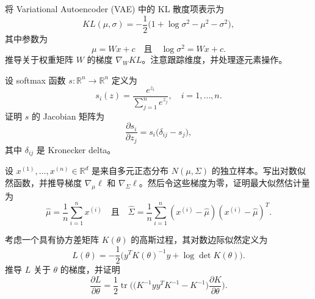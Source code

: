 \begin{exercise}
   将 Variational Autoencoder (VAE) 中的 KL 散度项表示为
   \[
      KL(\mu,\sigma) = -\frac{1}{2}\Big(1 + \log\sigma^2 - \mu^2 - \sigma^2\Big),
   \]
   其中参数为
   \[
      \mu = W x + c \quad \text{且} \quad \log\sigma^2 = W x + c.
   \]
   推导关于权重矩阵 $W$ 的梯度 $\nabla_W KL$。注意跟踪维度，并处理逐元素操作。
\end{exercise}
\begin{exercise}
   设 softmax 函数 $s:\mathbb{R}^n \to \mathbb{R}^n$ 定义为
   \[
      s_i(z) = \frac{e^{z_i}}{\sum_{j=1}^n e^{z_j}}, \quad i=1,\dots,n.
   \]
   证明 $s$ 的 Jacobian 矩阵为
   \[
      \frac{\partial s_i}{\partial z_j} = s_i\big(\delta_{ij} - s_j\big),
   \]
   其中 $\delta_{ij}$ 是 Kronecker delta。
\end{exercise}

\begin{exercise}
   设 $x^{(1)},\dots,x^{(n)} \in \mathbb{R}^d$ 是来自多元正态分布 $N(\mu,\Sigma)$ 的独立样本。写出对数似然函数，并推导梯度 $\nabla_\mu \ell$ 和 $\nabla_\Sigma \ell$。然后令这些梯度为零，证明最大似然估计量为
   \[
      \hat\mu = \frac{1}{n}\sum_{i=1}^n x^{(i)} \quad \text{且} \quad \hat\Sigma = \frac{1}{n}\sum_{i=1}^n (x^{(i)} - \hat\mu)(x^{(i)} - \hat\mu)^T.
   \]
\end{exercise}

\begin{exercise}
   考虑一个具有协方差矩阵 $K(\theta)$ 的高斯过程，其对数边际似然定义为
   \[
      L(\theta) = -\frac{1}{2}\Big(y^T K(\theta)^{-1} y + \log\det K(\theta)\Big).
   \]
   推导 $L$ 关于 $\theta$ 的梯度，并证明
   \[
      \frac{\partial L}{\partial \theta} = \frac{1}{2}\operatorname{tr}\!\Big(\Big(K^{-1}yy^T K^{-1} - K^{-1}\Big)\frac{\partial K}{\partial \theta}\Big).
   \]
\end{exercise}

